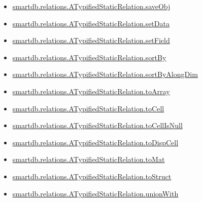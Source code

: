 \documentclass[letterpaper,10pt,english]{sphinxmanual}
\begin{document}
\begin{itemize}
\item {} 
{\hyperref[chap_functions:smartdb-relations-atypifiedstaticrelation-saveobj]{smartdb.relations.ATypifiedStaticRelation.saveObj}}

\item {} 
{\hyperref[chap_functions:smartdb-relations-atypifiedstaticrelation-setdata]{smartdb.relations.ATypifiedStaticRelation.setData}}

\item {} 
{\hyperref[chap_functions:smartdb-relations-atypifiedstaticrelation-setfield]{smartdb.relations.ATypifiedStaticRelation.setField}}

\item {} 
{\hyperref[chap_functions:smartdb-relations-atypifiedstaticrelation-sortby]{smartdb.relations.ATypifiedStaticRelation.sortBy}}

\item {} 
{\hyperref[chap_functions:smartdb-relations-atypifiedstaticrelation-sortbyalongdim]{smartdb.relations.ATypifiedStaticRelation.sortByAlongDim}}

\item {} 
{\hyperref[chap_functions:smartdb-relations-atypifiedstaticrelation-toarray]{smartdb.relations.ATypifiedStaticRelation.toArray}}

\item {} 
{\hyperref[chap_functions:smartdb-relations-atypifiedstaticrelation-tocell]{smartdb.relations.ATypifiedStaticRelation.toCell}}

\item {} 
{\hyperref[chap_functions:smartdb-relations-atypifiedstaticrelation-tocellisnull]{smartdb.relations.ATypifiedStaticRelation.toCellIsNull}}

\item {} 
{\hyperref[chap_functions:smartdb-relations-atypifiedstaticrelation-todispcell]{smartdb.relations.ATypifiedStaticRelation.toDispCell}}

\item {} 
{\hyperref[chap_functions:smartdb-relations-atypifiedstaticrelation-tomat]{smartdb.relations.ATypifiedStaticRelation.toMat}}

\item {} 
{\hyperref[chap_functions:smartdb-relations-atypifiedstaticrelation-tostruct]{smartdb.relations.ATypifiedStaticRelation.toStruct}}

\item {} 
{\hyperref[chap_functions:smartdb-relations-atypifiedstaticrelation-unionwith]{smartdb.relations.ATypifiedStaticRelation.unionWith}}


\end{itemize}
\end{document}

